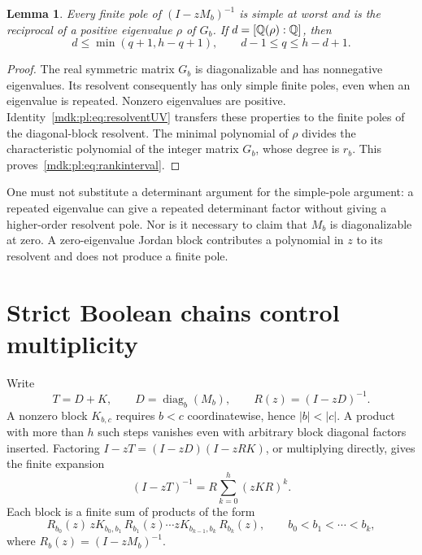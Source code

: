 \documentclass[11pt,letterpaper]{article}
\numberwithin{equation}{section}
\newtheorem{lemma}[theorem]{Lemma}
\theoremstyle{remark}\newtheorem{remark}[theorem]{Remark}
\newcommand{\diag}{\operatorname{diag}}
\begin{document}
\begin{lemma}\label{mdk:pl:lem:localpole}
Every finite pole of $(I-zM_b)^{-1}$ is simple at worst and is the reciprocal of a positive eigenvalue $\rho$ of $G_b$. If $d=[\mathbb Q(\rho):\mathbb Q]$, then
\begin{equation}\label{mdk:pl:eq:rankinterval}
 d\le\min(q+1,h-q+1),\qquad d-1\le q\le h-d+1.
\end{equation}
\end{lemma}
\begin{proof}
The real symmetric matrix $G_b$ is diagonalizable and has nonnegative eigenvalues. Its resolvent consequently has only simple finite poles, even when an eigenvalue is repeated. Nonzero eigenvalues are positive. Identity~\eqref{mdk:pl:eq:resolventUV} transfers these properties to the finite poles of the diagonal-block resolvent. The minimal polynomial of $\rho$ divides the characteristic polynomial of the integer matrix $G_b$, whose degree is $r_b$. This proves~\eqref{mdk:pl:eq:rankinterval}.
\end{proof}

One must not substitute a determinant argument for the simple-pole argument: a repeated eigenvalue can give a repeated determinant factor without giving a higher-order resolvent pole. Nor is it necessary to claim that $M_b$ is diagonalizable at zero. A zero-eigenvalue Jordan block contributes a polynomial in $z$ to its resolvent and does not produce a finite pole.

\section{Strict Boolean chains control multiplicity}\label{mdk:pl:sec:chains}
Write
\[
 T=D+K,\qquad D=\diag_b(M_b),\qquad R(z)=(I-zD)^{-1}.
\]
A nonzero block $K_{b,c}$ requires $b<c$ coordinatewise, hence $|b|<|c|$. A product with more than $h$ such steps vanishes even with arbitrary block diagonal factors inserted. Factoring $I-zT=(I-zD)(I-zRK)$, or multiplying directly, gives the finite expansion
\begin{equation}\label{mdk:pl:eq:chainexpansion}
 (I-zT)^{-1}=R\sum_{k=0}^{h}(zKR)^k.
\end{equation}
Each block is a finite sum of products of the form
\begin{equation}\label{mdk:pl:eq:chainterm}
 R_{b_0}(z)\,zK_{b_0,b_1}\,R_{b_1}(z)\cdots
 zK_{b_{k-1},b_k}\,R_{b_k}(z),
 \qquad b_0<b_1<\cdots<b_k,
\end{equation}
where $R_b(z)=(I-zM_b)^{-1}$.
\end{document}
